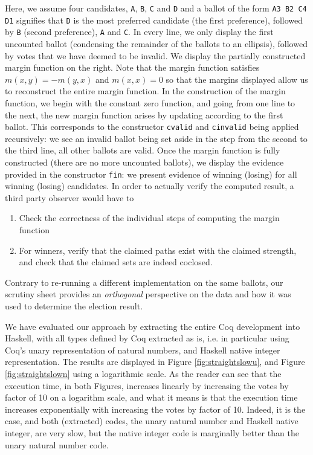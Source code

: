 
\noindent
Here, we assume four candidates, \texttt{A}, \texttt{B}, \texttt{C}
and \texttt{D} and a ballot of the form \texttt{A3  B2  C4  D1}
signifies that \texttt{D} is the most preferred candidate (the first
preference), followed by \texttt{B} (second preference), \texttt{A}
and \texttt{C}. In every line, we only display the first uncounted
ballot (condensing the remainder of the ballots to an ellipsis),
followed by votes that we have deemed to be invalid. We display the
partially constructed margin function on the right. Note that the
margin function satisfies  $m(x, y) = -m(y, x)$ and $m(x, x) = 0$ so
that the margins displayed allow us to reconstruct the entire margin
function. In the construction of the margin function, we begin with
the constant zero function, and going from one line to the next, the
new margin function arises by updating according to the first
ballot. This corresponds to the constructor \texttt{cvalid} and
\texttt{cinvalid} being
applied recursively: we see an invalid ballot being set aside in the
step from the second to the third line, all other ballots are valid.
Once the margin function is fully constructed (there are no
more uncounted ballots), we display the evidence provided in the
constructor \texttt{fin}: we present evidence of winning (losing) for
all winning (losing) candidates. 
%
In order to actually verify the computed result, a third party
observer would have to
\begin{enumerate}
\item Check the correctness of the individual steps of computing the
margin function
\item For winners, verify that the claimed paths exist with the
claimed strength, and check that the claimed sets are indeed
coclosed.
\end{enumerate}

\noindent
Contrary to re-running a different implementation on the same
ballots, our scrutiny sheet provides an \emph{orthogonal}
perspective on the data and how it was used to determine the
election result.



We have evaluated our approach by extracting the entire Coq
development into Haskell, with all types defined by Coq extracted as
is, i.e. in particular using Coq's unary representation of natural
numbers, and Haskell native integer representation. The results are displayed in Figure \ref{fig:straightslowu}, 
and Figure \ref{fig:straightslown}
using a logarithmic scale.  As the reader can see that
the execution time, in both Figures, increases linearly  by increasing the votes by factor of 10
on a logarithm scale, and what it means is that the execution time 
increases exponentially with increasing the votes by factor of 10. Indeed, 
it is the case, and both (extracted) codes, the unary natural number and Haskell native integer, 
are very slow, but the native integer code is marginally better than the unary natural number code. 

